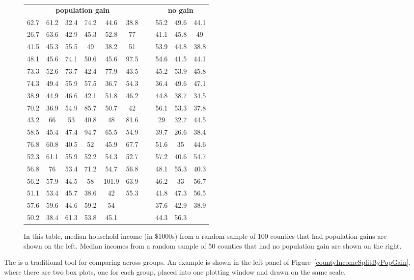 \begin{figure}
\centering
\begin{tabular}{ ccc ccc c ccc }
\multicolumn{6}{c}{\bf population gain} &&
    \multicolumn{3}{c}{\bf no gain} \\ 
  \cline{1-6} \cline{8-10}
62.7 & 61.2 & 32.4 & 74.2 & 44.6 & 38.8 &\hspace{5mm}\ &
    55.2 & 49.6 & 44.1 \\
26.7 & 63.6 & 42.9 & 45.3 & 52.8 & 77 && 41.1 & 45.8 & 49 \\
41.5 & 45.3 & 55.5 & 49 & 38.2 & 51 && 53.9 & 44.8 & 38.8 \\
48.1 & 45.6 & 74.1 & 50.6 & 45.6 & 97.5 && 54.6 & 41.5 & 44.1 \\
73.3 & 52.6 & 73.7 & 42.4 & 77.9 & 43.5 && 45.2 & 53.9 & 45.8 \\
74.3 & 49.4 & 55.9 & 57.5 & 36.7 & 54.3 && 36.4 & 49.6 & 47.1 \\
38.9 & 44.9 & 46.6 & 42.1 & 51.8 & 46.2 && 44.8 & 38.7 & 34.5 \\
70.2 & 36.9 & 54.9 & 85.7 & 50.7 & 42 && 56.1 & 53.3 & 37.8 \\
43.2 & 66 & 53 & 40.8 & 48 & 81.6 && 29 & 32.7 & 44.5 \\
58.5 & 45.4 & 47.4 & 94.7 & 65.5 & 54.9 && 39.7 & 26.6 & 38.4 \\
76.8 & 60.8 & 40.5 & 52 & 45.9 & 67.7 && 51.6 & 35 & 44.6 \\
52.3 & 61.1 & 55.9 & 52.2 & 54.3 & 52.7 && 57.2 & 40.6 & 54.7 \\
56.8 & 76 & 53.4 & 71.2 & 54.7 & 56.8 && 48.1 & 55.3 & 40.3 \\
56.2 & 57.9 & 44.5 & 58 & 101.9 & 63.9 && 46.2 & 33 & 56.7 \\
51.1 & 53.4 & 45.7 & 38.6 & 42 & 55.3 && 41.8 & 47.3 & 56.5 \\
57.6 & 59.6 & 44.6 & 59.2 & 54 &  && 37.6 & 42.9 & 38.9 \\
50.2 & 38.4 & 61.3 & 53.8 & 45.1 &  && 44.3 & 56.3 &  \\
\cline{1-6} \cline{8-10}
\end{tabular}
\caption{In this table, median household income (in \$1000s)
    from a random sample of 100 counties that had population
    gains are shown on the left.
    Median incomes from a random sample of 50 counties that
    had no population gain are shown on the right.}
\label{countyIncomeSplitByPopGainTable}
\end{figure}

The 
is a traditional tool for comparing across groups.
An example is shown in the left panel of
Figure~\ref{countyIncomeSplitByPopGain},
where there are two box plots, one for each group,
placed into one plotting window and drawn on the same scale.

